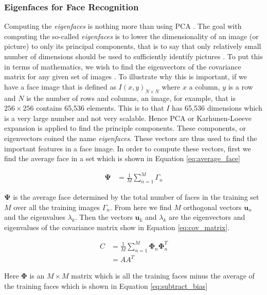 \documentclass[
	submission,
	final,
	notitlepage,
	narroweqnarray,
	inline,
	twoside,
	]{ieee}
\begin{document}
\subsubsection{Eigenfaces for Face Recognition}
Computing the \textit{eigenfaces} is nothing more than using PCA \cite{eigen_faces}.
The goal with computing the so-called \textit{eigenfaces} is to lower the dimensionality
of an image (or picture) to only its principal components, that is to say
that only relatively small number of dimensions should be used
to sufficiently identify pictures \cite{eigen_faces}. To put this in
terms of mathematics, we wish to find the eigenvectors of the covariance
matrix for any given set of images \cite{eigen_face_recognition}. To
illustrate why this is important, if we have a face image that is defined
as $I(x,y)_{N \times N}$ where $x$ a column, $y$ is a row and $N$ is the
number of rows and columns, an image, for example, that is $256 \times 256$ contains 65,536 elements.
This is to that $I$ has 65,536 dimensions which is a very large number
and not very scalable. Hence PCA or Karhunen-Loeeve expansion is
applied to find the principle components. These components, or
eigenvectors coined the name \textit{eigenfaces}. These vectors are thus
used to find the important features in a face image. In order to compute
these vectors, first we
find the average face in a set which is shown in Equation \ref{eq:average_face}

\begin{align}
  \mathbf{\Psi} &= \frac{1}{M} \sum_{n=1}^{M}\Gamma_n \label{eq:average_face}
\end{align}

$\mathbf{\Psi}$ is the average face determined by the total number of faces
in the training set $M$ over all the training images $\Gamma_n$. From
here we find $M$ orthogonal vectors $\mathbf{u}_n$ and the eigenvalues
$\lambda_k$. Then the vectors $\mathbf{u}_k$ and $\lambda_k$ are the
eigenvectors and eigenvalues of the covariance matrix show in Equation
\ref{eq:cov_matrix}.


\begin{align}
  C &= \frac{1}{M} \sum_{n=1}^M \mathbf{\Phi}_n \mathbf{\Phi}_n^T \label{eq:cov_matrix} \\
  &= AA^T
\end{align}

Here $\mathbf{\Phi}$ is an $M \times M$ matrix  which is all the
training faces minus the average of the training faces which is
shown in Equation \ref{eq:subtract_bias}
\end{document}
